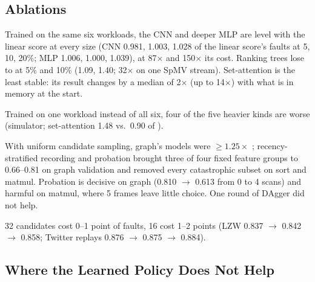 \subsection{Ablations}
\label{sec:eval-ablate}

 Trained on the same six workloads, the CNN
and deeper MLP are level with the linear score at every size (CNN 0.981, 1.003, 1.028 of
the linear score's faults at 5, 10, 20\%; MLP 1.006, 1.000, 1.039), at 87$\times$ and
150$\times$ its cost. Ranking trees lose to \clock at 5\% and 10\% (1.09, 1.40; 32$\times$
\clock on one SpMV stream). Set-attention is the least stable: its result changes by a
median of 2$\times$ (up to 14$\times$) with what is in memory at the start.

 Trained on one workload instead of all six, four of the five
heavier kinds are worse (simulator; set-attention 1.48 vs.\ 0.90 of \clock).

 With uniform candidate sampling, graph's models
were $\geq1.25\times$ \clock; recency-stratified recording and probation brought three of
four fixed feature groups to 0.66--0.81 on graph validation and removed every catastrophic
subset on sort and matmul. Probation is decisive on graph (0.810 $\rightarrow$ 0.613 from
0 to 4 scans) and harmful on matmul, where 5 frames leave little choice. One round of
DAgger did not help.

 32 candidates cost 0--1 point of faults, 16 cost 1--2 points
(LZW 0.837 $\rightarrow$ 0.842 $\rightarrow$ 0.858; Twitter replays 0.876 $\rightarrow$
0.875 $\rightarrow$ 0.884).

\subsection{Where the Learned Policy Does Not Help}
\label{sec:eval-loss}

